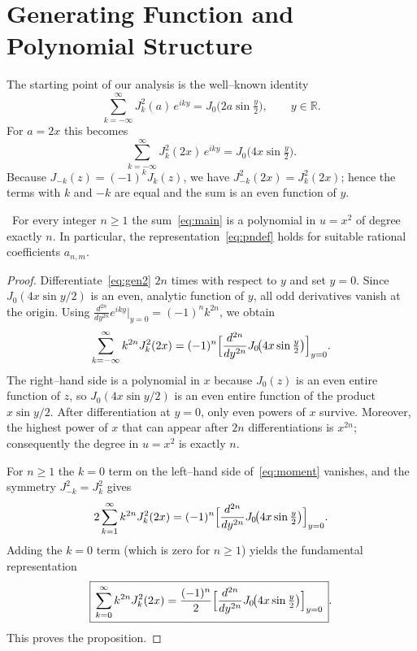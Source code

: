 \documentclass[10pt]{NSP1}
\begin{document}
\section{Generating Function and Polynomial Structure}
\label{sec:gen}

The starting point of our analysis is the well--known identity~\cite{Watson,Gradshteyn}
\begin{equation}\label{eq:gen}
\sum_{k=-\infty}^{\infty}J_k^2(a)\,e^{iky}=J_0\!\bigl(2a\sin\tfrac{y}{2}\bigr),\qquad y\in\mathbb R.
\end{equation}
For $a=2x$ this becomes
\begin{equation}\label{eq:gen2}
\sum_{k=-\infty}^{\infty}J_k^2(2x)\,e^{iky}=J_0\!\bigl(4x\sin\tfrac{y}{2}\bigr).
\end{equation}
Because $J_{-k}(z)=(-1)^kJ_k(z)$, we have $J_{-k}^2(2x)=J_k^2(2x)$; hence the terms with 
$k$ and $-k$ are equal and the sum is an even function of $y$.

\begin{proposition}\label{prop:poly} \,
For every integer $n\ge 1$ the sum~\eqref{eq:main} is a polynomial in $u=x^2$ of degree 
exactly $n$.  In particular, the representation~\eqref{eq:pndef} holds for suitable rational 
coefficients $a_{n,m}$.
\end{proposition}

\begin{proof}
Differentiate~\eqref{eq:gen2} $2n$ times with respect to $y$ and set $y=0$.  Since 
$J_0(4x\sin y/2)$ is an even, analytic function of $y$, all odd derivatives vanish at the 
origin.  Using $\frac{d^{2n}}{dy^{2n}}e^{iky}\big|_{y=0}=(-1)^n k^{2n}$, we obtain
\begin{equation}\label{eq:moment}
\sum_{k=-\infty}^{\infty}k^{2n}J_k^2(2x)=(-1)^n\Bigl[\frac{d^{2n}}{dy^{2n}}J_0\!\bigl(4x\sin\tfrac{y}{2}\bigr)\Bigr]_{y=0}.
\end{equation}
The right--hand side is a polynomial in $x$ because $J_0(z)$ is an even entire function of $z$, 
so $J_0(4x\sin y/2)$ is an even entire function of the product $x\sin y/2$.  After 
differentiation at $y=0$, only even powers of $x$ survive.  Moreover, the highest power of $x$ 
that can appear after $2n$ differentiations is $x^{2n}$; consequently the degree in $u=x^2$ is 
exactly $n$.

For $n\ge 1$ the $k=0$ term on the left--hand side of~\eqref{eq:moment} vanishes, and the 
symmetry $J_{-k}^2=J_k^2$ gives
\[
2\sum_{k=1}^{\infty}k^{2n}J_k^2(2x)=(-1)^n\Bigl[\frac{d^{2n}}{dy^{2n}}J_0\!\bigl(4x\sin\tfrac{y}{2}\bigr)\Bigr]_{y=0}.
\]
Adding the $k=0$ term (which is zero for $n\ge 1$) yields the fundamental representation
\begin{equation}\label{eq:basic}
\boxed{\,\sum_{k=0}^{\infty}k^{2n}J_k^2(2x)=\frac{(-1)^n}{2}\Bigl[\frac{d^{2n}}{dy^{2n}}J_0\!\bigl(4x\sin\tfrac{y}{2}\bigr)\Bigr]_{y=0}\,}.
\end{equation}
This proves the proposition.
\end{proof}
\end{document}
